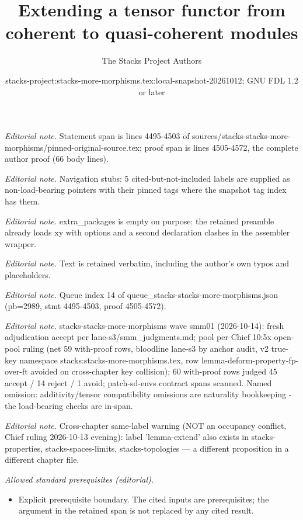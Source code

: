 \documentclass[10pt,a4paper]{amsart}
\title{Extending a tensor functor from coherent to quasi-coherent modules}
\author{The Stacks Project Authors}
\date{stacks-project:stacks-more-morphisms.tex:local-snapshot-20261012; GNU FDL 1.2 or later}
\theoremstyle{plain}
\theoremstyle{definition}
\theoremstyle{remark}
\numberwithin{equation}{subsection}
\begin{document}
\maketitle
\noindent\textit{Editorial note.} Statement span is lines 4495-4503 of sources/stacks-stacks-more-morphisms/pinned-original-source.tex; proof span is lines 4505-4572, the complete author proof (66 body lines).\par\medskip
\noindent\textit{Editorial note.} Navigation stubs: 5 cited-but-not-included labels are supplied as non-load-bearing pointers with their pinned tags where the snapshot tag index has them.\par\medskip
\noindent\textit{Editorial note.} extra\_packages is empty on purpose: the retained preamble already loads xy with options and a second declaration clashes in the assembler wrapper.\par\medskip
\noindent\textit{Editorial note.} Text is retained verbatim, including the author's own typos and placeholders.\par\medskip
\noindent\textit{Editorial note.} Queue index 14 of queue\_stacks-stacks-more-morphisms.json (pb=2989, stmt 4495-4503, proof 4505-4572).\par\medskip
\noindent\textit{Editorial note.} stacks-stacks-more-morphisms wave smm01 (2026-10-14): fresh adjudication accept per lane-s3/smm\_judgments.md; pool per Chief 10:5x open-pool ruling (net 59 with-proof rows, bloodline lane-s3 by anchor audit, v2 true-key namespace stacks:stacks-more-morphisms.tex, row lemma-deform-property-fp-over-ft avoided on cross-chapter key collision); 60 with-proof rows judged 45 accept / 14 reject / 1 avoid; patch-sd-envs contract spans scanned. Named omission: additivity/tensor compatibility omissions are naturality bookkeeping - the load-bearing checks are in-span.\par\medskip
\noindent\textit{Editorial note.} Cross-chapter same-label warning (NOT an occupancy conflict, Chief ruling 2026-10-13 evening): label 'lemma-extend' also exists in stacks-properties, stacks-spaces-limits, stacks-topologies — a different proposition in a different chapter file.\par\medskip
\noindent\textit{Allowed standard prerequisites (editorial).}\begin{itemize}
\item Explicit prerequisite boundary. The cited inputs are prerequisites; the argument in the retained span is not replaced by any cited result.
\end{itemize}\medskip
\end{document}
